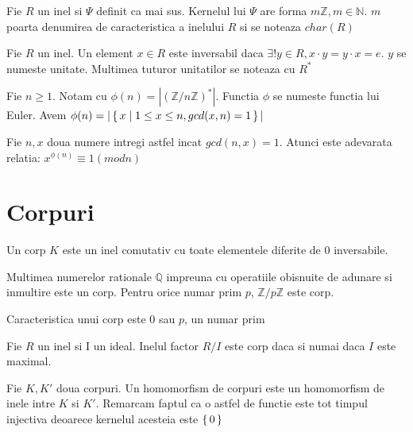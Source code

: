  \begin{dfn}
 Fie $R$ un inel si $\Psi$ definit ca mai sus. Kernelul lui $\Psi$ are forma $m\mathbb{Z}, m\in\mathbb{N}$. $m$ poarta denumirea de caracteristica a inelului $R$ si se noteaza $char(R)$
 \end{dfn}
 
 \begin{dfn}
 Fie $R$ un inel. Un element $x\in R$ este inversabil daca $\exists! y\in R, x\cdot y = y\cdot x = e$. $y$ se numeste unitate. Multimea tuturor unitatilor se noteaza cu $R^{*}$
 \end{dfn}
 
 \begin{dfn}
 Fie $n\geq 1$. Notam cu $\phi (n) = |(\mathbb{Z}/n\mathbb{Z})^{*}|$. Functia $\phi$ se numeste functia lui Euler. Avem $\phi (n) = |\set{x\mid 1\leq x\leq n, gcd(x, n)=1}|$
 \end{dfn}
 
 \begin{teo}
 Fie $n, x$ doua numere intregi astfel incat $gcd(n,x)=1$. Atunci este adevarata relatia:
  $x^{\phi(n)}\equiv 1 (mod n)$
 \end{teo}
 
 \section{Corpuri}
\label{sec:sec03}
\begin{dfn}
Un corp $K$ este un inel comutativ cu toate elementele diferite de $0$ inversabile.
\end{dfn}

\begin{ex}
Multimea numerelor rationale $\mathbb{Q}$ impreuna cu operatiile obisnuite de adunare si inmultire este un corp. Pentru orice numar prim $p$, $\mathbb{Z}/p\mathbb{Z}$ este corp.  
\end{ex}

\begin{prop}
Caracteristica unui corp este $0$ sau $p$, un numar prim
\end{prop}

\begin{prop}
Fie $R$ un inel si I un ideal. Inelul factor $R/I$ este corp daca si numai daca $I$ este maximal.
\end{prop}

\begin{dfn}
Fie $K, K'$ doua corpuri. Un homomorfism de corpuri este un homomorfism de inele intre $K$ si $K'$. Remarcam faptul ca o astfel de functie este tot timpul injectiva deoarece kernelul acesteia este $\set {0}$ 
\end{dfn}
